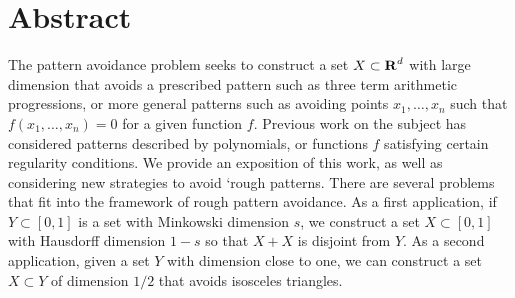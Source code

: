 
\chapter{Abstract}


The pattern avoidance problem seeks to construct a set $X \subset \operatorname{\mathbf{R}}^d$ with large dimension that avoids a prescribed pattern such as three term arithmetic progressions, or more general patterns such as avoiding points $x_1, \dots, x_n$ such that $f(x_1, \dots, x_n) = 0$ for a given function $f$. Previous work on the subject has considered patterns described by polynomials, or functions $f$ satisfying certain regularity conditions. We provide an exposition of this work, as well as considering new strategies to avoid `rough patterns. There are several problems that fit into the framework of rough pattern avoidance. As a first application, if $Y\subset[0,1]$ is a set with Minkowski dimension $s$, we construct a set $X\subset[0,1]$ with Hausdorff dimension $1-s$ so that $X+X$ is disjoint from $Y$. As a second application, given a set $Y$ with dimension close to one, we can construct a set $X\subset Y$ of dimension $1/2$ that avoids isosceles triangles.